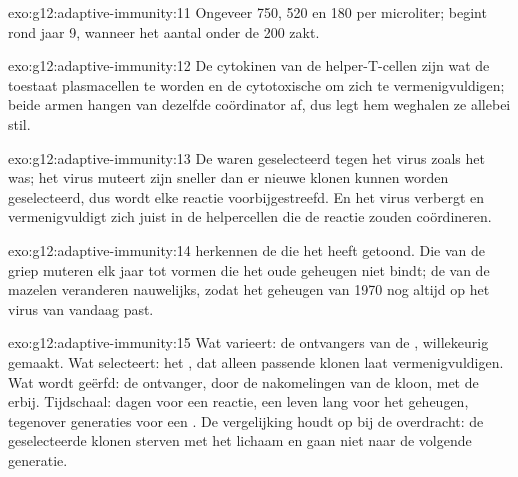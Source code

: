 \begin{solution}{exo:g12:adaptive-immunity:11}
Ongeveer 750, 520 en 180 per microliter;  begint rond jaar 9, wanneer
het aantal onder de 200 zakt.
\end{solution}

\begin{solution}{exo:g12:adaptive-immunity:12}
De cytokinen van de helper-T-cellen zijn wat de  toestaat
plasmacellen te worden en de cytotoxische  om zich te
vermenigvuldigen; beide armen hangen van dezelfde coördinator af, dus legt
hem weghalen ze allebei stil.
\end{solution}

\begin{solution}{exo:g12:adaptive-immunity:13}
De  waren geselecteerd tegen het virus zoals het was; het virus
muteert zijn  sneller dan er nieuwe klonen kunnen
worden geselecteerd, dus wordt elke reactie voorbijgestreefd. En het virus
verbergt en vermenigvuldigt zich juist in de helpercellen die de reactie
zouden coördineren.
\end{solution}

\begin{solution}{exo:g12:adaptive-immunity:14}
 herkennen de  die het  heeft
getoond. Die van de griep muteren elk jaar tot vormen die het oude
geheugen niet bindt; de  van de mazelen veranderen
nauwelijks, zodat het geheugen van 1970 nog altijd op het virus van
vandaag past.
\end{solution}

\begin{solution}{exo:g12:adaptive-immunity:15}
Wat varieert: de ontvangers van de , willekeurig gemaakt. Wat
selecteert: het , dat alleen passende klonen laat vermenigvuldigen.
Wat wordt geërfd: de ontvanger, door de nakomelingen van de kloon, met de
 erbij. Tijdschaal: dagen voor een reactie, een leven lang
voor het geheugen, tegenover generaties voor een . De vergelijking
houdt op bij de overdracht: de geselecteerde klonen sterven met het lichaam
en gaan niet naar de volgende generatie.
\end{solution}

